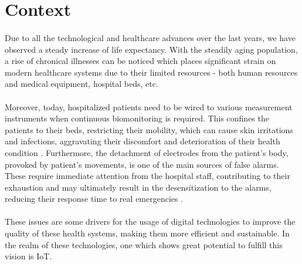 

\section{Context}

\paragraph{} Due to all the technological and healthcare advances over the last years, we have observed a steady increase of life expectancy. With the steadily aging population, a rise of chronical illnesses can be noticed which places significant strain on modern healthcare systems due to their limited resources - both human resources and medical equipment, hospital beds, etc.

\paragraph{} Moreover, today, hospitalized patients need to be wired to various measurement instruments when continuous biomonitoring is required. This confines the patients to their beds, restricting their mobility, which can cause skin irritations and infections, aggravating their discomfort and deterioration of their health condition \cite{Darwish2011}. Furthermore, the detachment of electrodes from the patient's body, provoked by patient's movements, is one of the main sources of false alarms. These require immediate attention from the hospital staff, contributing to their exhaustion and may ultimately result in the desensitization to the alarms, reducing their response time to real emergencies \cite{DursunErgezen2020}.

\paragraph{} These issues are some drivers for the usage of digital technologies to improve the quality of these health systems, making them more efficient and sustainable. %
In the realm of these technologies, one which shows great potential to fulfill this vision is \acf{IoT}.

